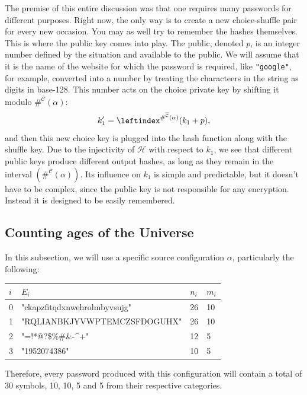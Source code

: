 \documentclass[12pt, a4paper]{article}
\newcommand{\CC}{\overline{\mathcal{C}}}
\renewcommand{\H}{\mathcal{H}}
\newcommand{\lui}[1]{\leftindex^{#1}}
\begin{document}
The premise of this entire discussion was that one requires many passwords for different purposes. Right now, the only way is to create a new choice-shuffle pair for every new occasion. You may as well try to remember the hashes themselves. This is where the public key comes into play. The public, denoted $ p $, is an integer number defined by the situation and available to the public. We will assume that it is the name of the website for which the password is required, like \texttt{"google"}, for example, converted into a number by treating the characteers in the string as digits in base-128. This number acts on the choice private key by shifting it modulo $ \#^{\CC}(\alpha) $:
\[ k_1' = \lui{\#^{\CC}(\alpha)}(k_1 + p), \] 
and then this new choice key is plugged into the hash function along with the shuffle key. Due to the injectivity of $ \H $ with respect to $ k_1 $, we see that different public keys produce different output hashes, as long as they remain in the interval $ \left( \#^{\CC}(\alpha) \right) $. Its influence on $ k_1 $ is simple and predictable, but it doesn't have to be complex, since the public key is not responsible for any encryption. Instead it is designed to be easily remembered.

\subsection{Counting ages of the Universe}

In this subsection, we will use a specific source configuration $ \alpha $, particularly the following:

\begin{center}
\def\arraystretch{1.2}
\begin{tabular}{l|l|l|l}\ttfamily
    $ i $ & $ E_i $ & $ n_i $ & $ m_i $\\
    \hline
    0 & \ttfamily"ckapzfitqdxnwehrolmbyvsujg" & 26 & 10\\
    1 & \ttfamily"RQLIANBKJYVWPTEMCZSFDOGUHX" & 26 & 10\\
    2 & \ttfamily"=!*@?\$\%\#\&-\^{}+"        & 12 & 5\\
    3 & \ttfamily"1952074386"                 & 10 & 5\\
\end{tabular}
\end{center}

Therefore, every password produced with this configuration will contain a total of 30 symbols, 10, 10, 5 and 5 from their respective categories.
\end{document}
